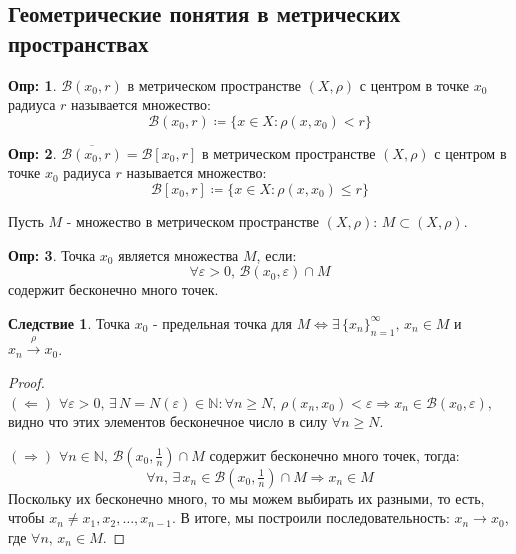 \documentclass[12pt]{article}
\newcommand{\MN}{\mathbb{N}}
\newcommand{\MB}{\mathcal{B}}
\newcommand{\VE}{\varepsilon}
\theoremstyle{definition}
\newtheorem{defn}{Опр:}
\newtheorem{corollary}{Следствие}
\newcommand{\ovl}[1]{\overline{#1}}
\begin{document}
\subsection*{Геометрические понятия в метрических пространствах}
\begin{defn}
	 $\MB(x_0,r)$ в метрическом пространстве $(X,\rho)$ с центром в точке $x_0$ радиуса $r$ называется множество:
	$$
		\MB(x_0,r) \coloneqq\{x \in X \colon \rho(x,x_0) < r\}
	$$
\end{defn}
\begin{defn}
	 $\ovl{\MB(x_0,r)} = \MB[x_0,r]$ в метрическом пространстве $(X,\rho)$ с центром в точке $x_0$ радиуса $r$ называется множество:
	$$
		\MB[x_0,r] \coloneqq\{x \in X \colon \rho(x,x_0) \leq r\}
	$$
\end{defn}
Пусть $M$ - множество в метрическом пространстве $(X,\rho)$: $M\subset (X,\rho)$.
\begin{defn}
	Точка $x_0$ является  множества $M$, если: 
	$$
		\forall \VE > 0, \, \MB(x_0,\VE) \cap M
	$$ 
	содержит бесконечно много точек.
\end{defn}
\begin{corollary}
	Точка $x_0$ - предельная точка для $M \Leftrightarrow \exists \, \{x_n\}_{n = 1}^{\infty}, \, x_n \in M$ и $x_n \xrightarrow{\rho}x_0$.
\end{corollary}
\begin{proof}\hfill\\
	$(\Leftarrow)$ $\forall \VE > 0, \, \exists \, N = N(\VE) \in \MN \colon \forall n \geq N, \, \rho(x_n,x_0) < \VE \Rightarrow x_n \in \MB(x_0,\VE)$, видно что этих элементов бесконечное число в силу $\forall n \geq N$.
	
	$(\Rightarrow)$ $\forall n \in \MN, \, \MB\left(x_0,\tfrac{1}{n}\right)\cap M$ содержит бесконечно много точек, тогда:
	$$
		\forall n, \, \exists \, x_n \in \MB\left(x_0, \tfrac{1}{n}\right)\cap M \Rightarrow x_n \in M
	$$ 
	Поскольку их бесконечно много, то мы можем выбирать их разными, то есть, чтобы $x_n \neq x_1,x_2, \dotsc, x_{n-1}$. В итоге, мы построили последовательность: $x_n \to x_0$, где $\forall n, \, x_n \in M$. 
\end{proof}
\end{document}
